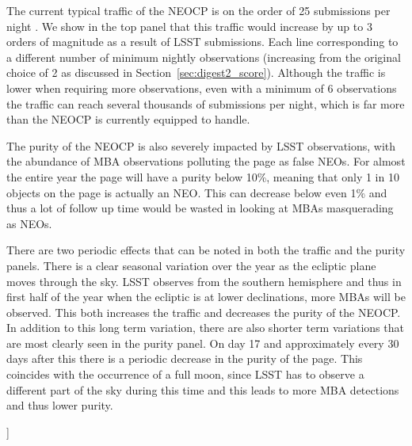 \documentclass[twocolumn, twocolappendix]{aastex631}
\newcommand{\todo}[1]{{\color{red}{[TODO: #1}]}}
\newcommand{\needcite}{{\color{magenta}{(needs citation)}}}
\begin{document}
The current typical traffic of the NEOCP is on the order of 25 submissions per night \needcite{}. We show in the top panel that this traffic would increase by up to 3 orders of magnitude as a result of LSST submissions. Each line corresponding to a different number of minimum nightly observations (increasing from the original choice of 2 as discussed in Section~\ref{sec:digest2_score}). Although the traffic is lower when requiring more observations, even with a minimum of 6 observations the traffic can reach several thousands of submissions per night, which is far more than the NEOCP is currently equipped to handle.

The purity of the NEOCP is also severely impacted by LSST observations, with the abundance of MBA observations polluting the page as false NEOs. For almost the entire year the page will have a purity below 10\%, meaning that only 1 in 10 objects on the page is actually an NEO. This can decrease below even 1\% and thus a lot of follow up time would be wasted in looking at MBAs masquerading as NEOs.

There are two periodic effects that can be noted in both the traffic and the purity panels. There is a clear seasonal variation over the year as the ecliptic plane moves through the sky. LSST observes from the southern hemisphere and thus in first half of the year when the ecliptic is at lower declinations, more MBAs will be observed. This both increases the traffic and decreases the purity of the NEOCP. In addition to this long term variation, there are also shorter term variations that are most clearly seen in the purity panel. On day 17 and approximately every 30 days after this there is a periodic decrease in the purity of the page. This coincides with the occurrence of a full moon, since LSST has to observe a different part of the sky during this time and this leads to more MBA detections and thus lower purity.

\todo{Check that I explained both of these effects correctly (particularly the moon one)}
\end{document}
